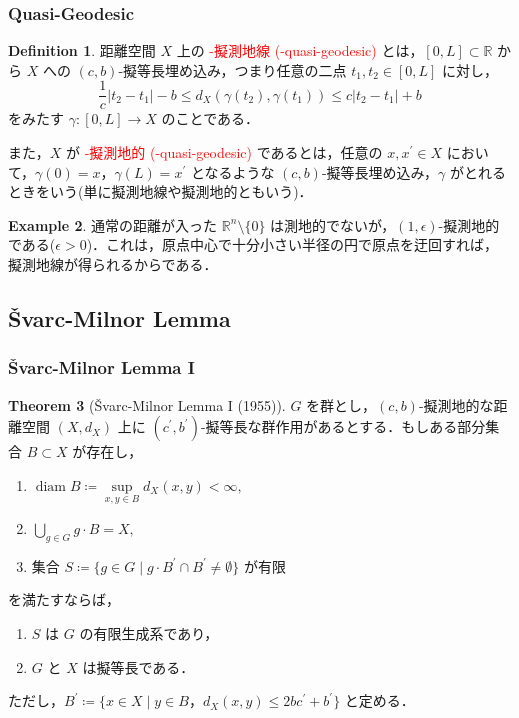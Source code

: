 \documentclass[10pt]{beamer}
\DeclareMathOperator{\diam}{diam}
\theoremstyle{definition}
\newtheorem{dfn}{Definition}[section]
\newtheorem{thm}[dfn]{Theorem}
\newtheorem{ex}[dfn]{Example}
\begin{document}
\begin{frame}
    \frametitle{Quasi-Geodesic}
    \begin{dfn}
    距離空間 $X$ 上の \textcolor{red}{-擬測地線 (-quasi-geodesic)} とは，$[0,L]\subset\mathbb{R}$ から $X$ への $(c,b)$-擬等長埋め込み，つまり任意の二点 $t_1,t_2\in [0,L]$ に対し，
    $$\frac{1}{c}|t_2-t_1|-b\leq d_X(\gamma(t_2),\gamma(t_1))\leq c|t_2-t_1|+b$$
    をみたす $\gamma\colon[0,L]\rightarrow X$ のことである．
    
    また，$X$ が \textcolor{red}{-擬測地的 (-quasi-geodesic)} であるとは，任意の $x,x^\prime\in X$ において，$\gamma(0)=x$，$\gamma(L)=x^\prime$ となるような $(c,b)$-擬等長埋め込み，$\gamma$ がとれるときをいう(単に擬測地線や擬測地的ともいう)．
    \end{dfn}

    \begin{ex}
    通常の距離が入った $\mathbb{R}^n\setminus\{0\}$ は測地的でないが，$(1,\epsilon)$-擬測地的である($\epsilon>0$)．これは，原点中心で十分小さい半径の円で原点を迂回すれば，擬測地線が得られるからである．
    \end{ex}
\end{frame}

\begin{frame}
    \section{Švarc-Milnor Lemma}
\end{frame}

\begin{frame}
    \frametitle{Švarc-Milnor Lemma I}
    \begin{thm}[Švarc-Milnor Lemma I (1955)]
    $G$ を群とし，$(c,b)$-擬測地的な距離空間 $(X,d_X)$ 上に $(c^\prime,b^\prime)$-擬等長な群作用があるとする．もしある部分集合 $B\subset X$ が存在し，
    \begin{enumerate}
    \item[(a)] $\diam B\coloneqq\underset{x,y\in B}{\sup}d_X(x,y)<\infty,$
    \item[(b)] $\bigcup_{g\in G}g\cdot B=X,$
    \item[(c)] 集合 $S\coloneqq\{g\in G\mid g\cdot B^\prime \cap B^\prime \neq \emptyset\}$ が有限
    \end{enumerate}
    を満たすならば，
    \begin{enumerate}
    \item $S$ は $G$ の有限生成系であり，\label{S_is_generating_set}
    \item $G$ と $X$ は擬等長である．\label{G~X}
    \end{enumerate}
    ただし，$B^\prime \coloneqq\{x\in X\mid y\in B，d_X(x,y)\leq 2bc^\prime+b^\prime\}$ と定める．
    \end{thm}
\end{frame}
\end{document}
